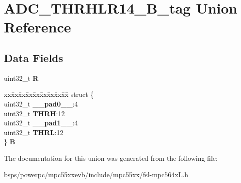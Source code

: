 \hypertarget{unionADC__THRHLR14__32B__tag}{}\section{A\+D\+C\+\_\+\+T\+H\+R\+H\+L\+R14\+\_\+B\+\_\+tag Union Reference}
\label{unionADC__THRHLR14__32B__tag}
\subsection*{Data Fields}
\begin{DoxyCompactItemize}
\item 
\mbox{\label{unionADC__THRHLR14__32B__tag_aa9bde40b7e53a4ffc3f81e51ba10f5db}} 
uint32\+\_\+t {\bfseries R}
\item 
\mbox{\label{unionADC__THRHLR14__32B__tag_a29ba4222b41e993701c3ca0f28ffc3f6}} 
\begin{tabbing}
xx\=xx\=xx\=xx\=xx\=xx\=xx\=xx\=xx\=\kill
struct \{\\
\>uint32\_t {\bfseries \_\_pad0\_\_}:4\\
\>uint32\_t {\bfseries THRH}:12\\
\>uint32\_t {\bfseries \_\_pad1\_\_}:4\\
\>uint32\_t {\bfseries THRL}:12\\
\} {\bfseries B}\\

\end{tabbing}\end{DoxyCompactItemize}


The documentation for this union was generated from the following file\+:\begin{DoxyCompactItemize}
\item 
bsps/powerpc/mpc55xxevb/include/mpc55xx/fsl-\/mpc564x\+L.\+h\end{DoxyCompactItemize}
